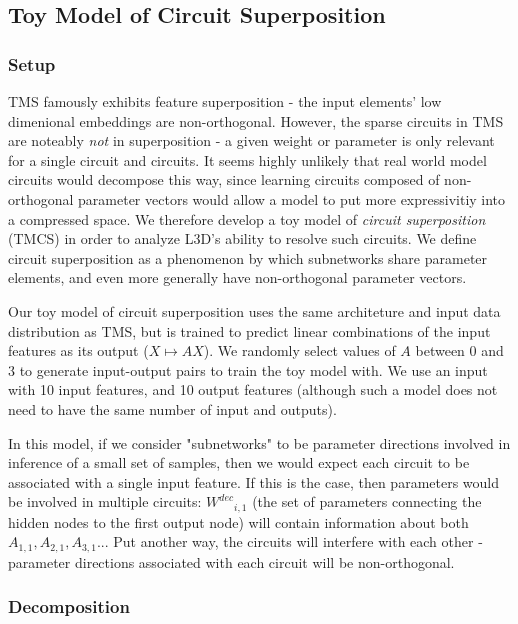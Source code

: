 \documentclass{article}
\theoremstyle{plain}
\theoremstyle{definition}
\theoremstyle{remark}
\begin{document}
\subsection{Toy Model of Circuit Superposition}

\subsubsection{Setup}


TMS famously exhibits feature superposition - the input elements' low dimenional embeddings are non-orthogonal. However, the sparse circuits in TMS are noteably \textit{not} in superposition - a given weight or parameter is only relevant for a single circuit and circuits. It seems highly unlikely that real world model circuits would decompose this way, since learning circuits composed of non-orthogonal parameter vectors would allow a model to put more expressivitiy into a compressed space. We therefore develop a toy model of \textit{circuit superposition} (TMCS) in order to analyze L3D's ability to resolve such circuits. We define circuit superposition as a phenomenon by which subnetworks share parameter elements, and even more generally have non-orthogonal parameter vectors. 

Our toy model of circuit superposition uses the same architeture and input data distribution as TMS, but is trained to predict linear combinations of the input features as its output ($X \mapsto A X$). We randomly select values of $A$ between 0 and 3 to generate input-output pairs to train the toy model with. We use an input with 10 input features, and 10 output features (although such a model does not need to have the same number of input and outputs).

In this model, if we consider "subnetworks" to be parameter directions involved in inference of a small set of samples, then we would expect each circuit to be associated with a single input feature. If this is the case, then parameters would be involved in multiple circuits: ${W^{dec}}_{i,1}$ (the set of parameters connecting the hidden nodes to the first output node) will contain information about both $A_{1,1}, A_{2,1}, A_{3,1}...$  Put another way, the circuits will interfere with each other - parameter directions associated with each circuit will be non-orthogonal. 

\subsubsection{Decomposition}
\end{document}
